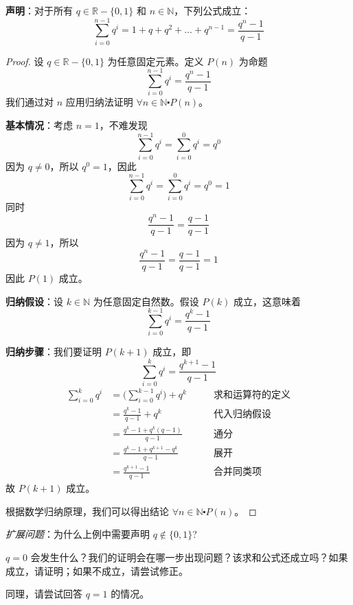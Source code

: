 \begin{example}[几何级数求和公式]
    
    \textbf{声明}：对于所有 $q \in \mathbb{R}-\{0,1\}$ 和 $n \in \mathbb{N}$，下列公式成立：
    \[\sum_{i=0}^{n-1}q^i = 1+q+q^2+\dots+q^{n-1} = \frac{q^n-1}{q-1}\]

    \begin{proof}
        设 $q \in \mathbb{R}-\{0,1\}$ 为任意固定元素。定义 $P(n)$ 为命题
        \[\sum_{i=0}^{n-1}q^i = \frac{q^n-1}{q-1}\]
        我们通过对 $n$ 应用归纳法证明 $\forall n \in \mathbb{N} \centerdot P(n)$。

        \textbf{基本情况}：考虑 $n=1$，不难发现
        \[\sum_{i=0}^{n-1}q^i = \sum_{i=0}^{0}q^i = q^0\]
        因为 $q \neq 0$，所以 $q^0=1$，因此
        \[\sum_{i=0}^{n-1}q^i = \sum_{i=0}^{0}q^i = q^0 = 1\]
        同时
        \[\frac{q^n-1}{q-1} = \frac{q-1}{q-1}\]
        因为 $q \neq 1$，所以
        \[\frac{q^n-1}{q-1} = \frac{q-1}{q-1} = 1\]
        因此 $P(1)$ 成立。

        \textbf{归纳假设}：设 $k \in \mathbb{N}$ 为任意固定自然数。假设 $P(k)$ 成立，这意味着
        \[\sum_{i=0}^{k-1}q^i = \frac{q^k-1}{q-1}\]

        \textbf{归纳步骤}：我们要证明 $P(k+1)$ 成立，即
        \[\sum_{i=0}^{k}q^i = \frac{q^{k+1}-1}{q-1}\]
        \begin{align*}
            \sum_{i=0}^{k}q^i &= \Bigg(\sum_{i=0}^{k-1}q^i\Bigg)+q^k &\qquad \text{求和运算符的定义}\\
            &= \frac{q^k-1}{q-1} + q^k &\qquad \text{代入归纳假设}\\
            &= \frac{q^k-1+q^k(q-1)}{q-1} &\qquad \text{通分}\\
            &= \frac{q^k-1+q^{k+1}-q^k}{q-1} &\qquad \text{展开}\\ 
            &= \frac{q^{k+1}-1}{q-1} &\qquad \text{合并同类项}
        \end{align*}
        故 $P(k+1)$ 成立。

        根据数学归纳原理，我们可以得出结论 $\forall n \in \mathbb{N} \centerdot P(n)$。
    \end{proof}
\end{example}

\emph{扩展问题}：为什么上例中需要声明 $q \notin \{0, 1\}$?

$q=0$ 会发生什么？我们的证明会在哪一步出现问题？该求和公式还成立吗？如果成立，请证明；如果不成立，请尝试修正。

同理，请尝试回答 $q=1$ 的情况。

